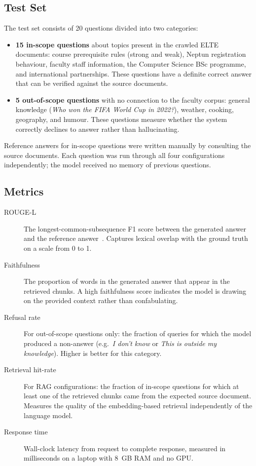 \subsection{Test Set}

The test set consists of 20 questions divided into two categories:

\begin{itemize}
    \item \textbf{15 in-scope questions} about topics present in the crawled ELTE documents: course prerequisite rules (strong and weak), Neptun registration behaviour, faculty staff information, the Computer Science BSc programme, and international partnerships. These questions have a definite correct answer that can be verified against the source documents.
    \item \textbf{5 out-of-scope questions} with no connection to the faculty corpus: general knowledge (\emph{Who won the FIFA World Cup in 2022?}), weather, cooking, geography, and humour. These questions measure whether the system correctly declines to answer rather than hallucinating.
\end{itemize}

Reference answers for in-scope questions were written manually by consulting the source documents. Each question was run through all four configurations independently; the model received no memory of previous questions.

\subsection{Metrics}

\begin{description}
    \item[ROUGE-L] The longest-common-subsequence F1 score between the generated answer and the reference answer~\cite{lin2004rouge}. Captures lexical overlap with the ground truth on a scale from 0 to 1.
    \item[Faithfulness] The proportion of words in the generated answer that appear in the retrieved chunks. A high faithfulness score indicates the model is drawing on the provided context rather than confabulating.
    \item[Refusal rate] For out-of-scope questions only: the fraction of queries for which the model produced a non-answer (e.g.\ \emph{I don't know} or \emph{This is outside my knowledge}). Higher is better for this category.
    \item[Retrieval hit-rate] For RAG configurations: the fraction of in-scope questions for which at least one of the retrieved chunks came from the expected source document. Measures the quality of the embedding-based retrieval independently of the language model.
    \item[Response time] Wall-clock latency from request to complete response, measured in milliseconds on a laptop with 8~GB RAM and no GPU.
\end{description}


